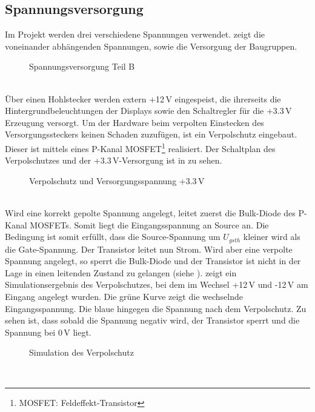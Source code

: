 \subsection{Spannungsversorgung}
Im Projekt werden drei verschiedene Spannungen verwendet.  zeigt die voneinander abhängenden Spannungen, sowie die Versorgung der Baugruppen.
\begin{figure}[htp]
	\center
    \caption{Spannungsversorgung Teil B}
    \label{fig:teilb_supply}
\end{figure}\\
Über einen Hohlstecker werden extern +12\,V eingespeist, die ihrerseits die Hintergrundbeleuchtungen der Displays sowie den Schaltregler für die +3.3\,V Erzeugung versorgt. Um der Hardware beim verpolten Einstecken des Versorgungssteckers keinen Schaden zuzufügen, ist ein Verpolschutz eingebaut. Dieser ist mittels eines P-Kanal MOSFET\footnote{MOSFET: Feldeffekt-Transistor}  realisiert. Der Schaltplan des Verpolschutzes und der +3.3\,V-Versorgung ist in  zu sehen.
\begin{figure}[htp]
	\center
    \caption{Verpolschutz und Versorgungsspannung +3.3\,V}
    \label{fig:3_3_supply}
\end{figure}\\
Wird eine korrekt gepolte Spannung angelegt, leitet zuerst die Bulk-Diode des P-Kanal MOSFETs. Somit liegt die Eingangsspannung an Source an. Die Bedingung ist somit erfüllt, dass die Source-Spannung um $U_{gsth}$ kleiner wird als die Gate-Spannung. Der Transistor leitet nun Strom. Wird aber eine verpolte Spannung angelegt, so sperrt die Bulk-Diode und der Transistor ist nicht in der Lage in einen leitenden Zustand zu gelangen (siehe \cite{Miller2010}).  zeigt ein Simulationsergebnis des Verpolschutzes, bei dem im Wechsel +12\,V und -12\,V am Eingang angelegt wurden. Die grüne Kurve zeigt die wechselnde Eingangsspannung. Die blaue hingegen die Spannung nach dem Verpolschutz. Zu sehen ist, dass sobald die Spannung negativ wird, der Transistor sperrt und die Spannung bei 0\,V liegt.
\begin{figure}[htp]
	\center
    \caption{Simulation des Verpolschutz}
    \label{fig:verpolschutz_sim}
\end{figure}\\

